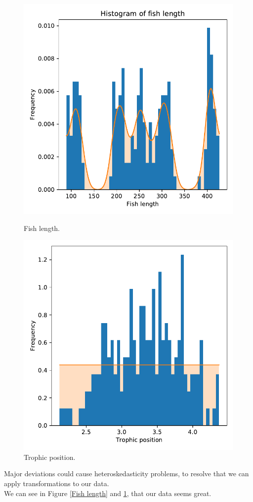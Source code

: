 \documentclass{article}
\begin{document}
\begin{figure}[h!]
    \begin{minipage}[c]{0,3\textwidth}
    \centering
    \includegraphics[scale = 0.6]{images/hist_fish_length.pdf}
    \caption{Fish length.}
    \label{Fish length}
    \end{minipage}
    \begin{minipage}[c]{0,9\textwidth}
    \centering
    \includegraphics[scale = 0.7]{images/hist_trophic_pos.pdf}
    \caption{Trophic position.}
    \label{Trophic position}
    \end{minipage}
\end{figure}
Major deviations could cause heteroskedasticity problems, to resolve that we can apply transformations to our data.\\
We can see in Figure \ref{Fish length} and \ref{Trophic position}, that our data seems great.
\end{document}
